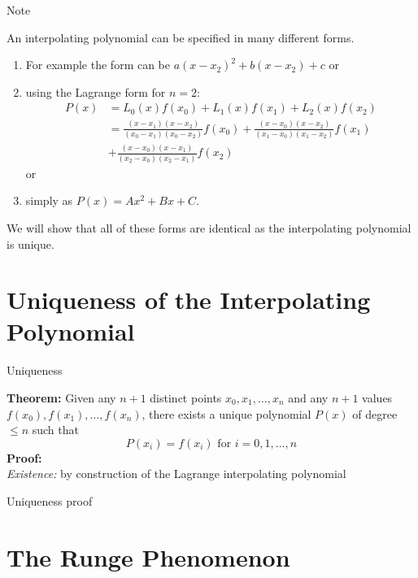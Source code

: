\documentclass[12pt]{beamer}
\begin{document}
\begin{frame}{Note} 

An interpolating polynomial can be specified in many different forms.
\begin{enumerate}
\item{For example the form 
can be $a(x-x_2)^2 + b(x-x_2) + c$ or}
\item{using the Lagrange form for $n=2$: 
\begin{align*}
P(x) &= L_0(x) f(x_0) + L_1(x) f(x_1) + L_2(x) f(x_2) \\
     &= \frac{(x-x_1)(x-x_2)}{(x_0 - x_1)(x_0-x_2)}f(x_0) + \frac{(x-x_0)(x-x_2)}{(x_1-x_0)(x_1-x_2)} f(x_1) \\ 
     &+ \frac{(x-x_0)(x-x_1)}{(x_2-x_0)(x_2-x_1)}f(x_2) 
\end{align*} 
\noindent 
or}
\item{simply as $P(x) = Ax^2 + Bx + C$.}
\end{enumerate}

We will show that all of these forms are identical as the interpolating polynomial is unique.  
\end{frame} 

\section{Uniqueness of the Interpolating Polynomial}

\begin{frame}{Uniqueness} 

{\bf Theorem:} Given any $n+1$ distinct points $x_0, x_1, \dots, x_n$ and any $n+1$ values 
$f(x_0), f(x_1), \dots, f(x_n)$, there exists a unique polynomial $P(x)$ of degree $\leq n$ such that 
\[
P(x_i) = f(x_i) \mbox{ for } i = 0, 1, ..., n
\]
\noindent 
{\bf Proof:} \\
{\it Existence:} by construction of the Lagrange interpolating polynomial 
\\
\end{frame} 

\begin{frame}{Uniqueness proof} 

\end{frame} 


\section{The Runge Phenomenon}
\end{document}
